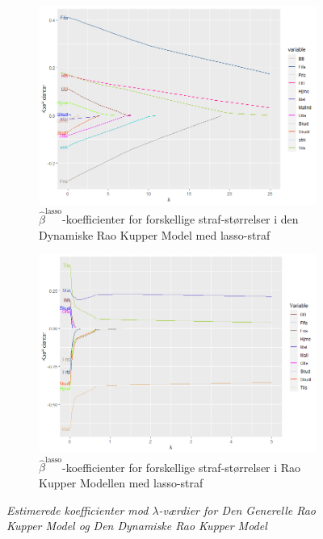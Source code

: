 \documentclass[11pt,a4paper]{article}
\begin{document}
\begin{figure}[h!]
  \centering
  \begin{subfigure}[b]{0.425\linewidth}
    \includegraphics[width=\textwidth]{LINEPLOTDYNALPHA.png}
    \caption{$\hat{\beta}^{\text{lasso}}$-koefficienter for forskellige straf-størrelser i den Dynamiske Rao Kupper Model med lasso-straf}
    \label{fig:DBetaLasso}
  \end{subfigure}
  \begin{subfigure}[b]{0.425\linewidth}
    \includegraphics[width=\textwidth]{SKL2.png}
    \caption{$\hat{\beta}^{\text{lasso}}$-koefficienter for forskellige straf-størrelser i Rao Kupper Modellen med lasso-straf}
    \label{fig:StatiskLine}
  \end{subfigure}
\caption{\textit{Estimerede koefficienter mod $\lambda$-værdier for Den Generelle Rao Kupper Model og Den Dynamiske Rao Kupper Model}}
  \label{fig:KoefficienterLambda}
\end{figure}
\end{document}
